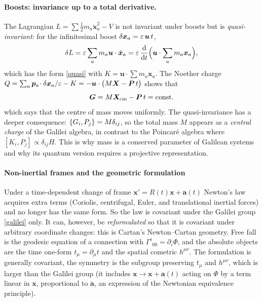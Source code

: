 \paragraph{Boosts: invariance up to a total derivative.}
The Lagrangian $L=\sum\tfrac12m_a\dot{\bm{x}}_a^2-V$ is not invariant under boosts
but is \emph{quasi-invariant}: for the infinitesimal boost
$\delta{\bm{x}}_a=\varepsilon\,\bm u\,t$,
\begin{equation}
  \delta L=\varepsilon\sum_a m_a\bm u\cdot\dot{\bm{x}}_a=\varepsilon\,\frac{\mathrm{d}}{\mathrm{d} t}\Big(\bm u\cdot\sum_a m_a{\bm{x}}_a\Big),
\end{equation}
which has the form \eqref{quasi} with $K=\bm u\cdot\sum m_a{\bm{x}}_a$. The
Noether charge $Q=\sum_a{\bm{p}}_a\!\cdot\delta{\bm{x}}_a/\varepsilon-K=-\bm u\cdot\big(M\bm X-\bm P\,t\big)$
shows that
\begin{equation}
  \bm G=M\bm X_{\rm cm}-\bm P\,t=\text{const.}
\end{equation}
which says that the centre of mass moves uniformly. The quasi-invariance has a
deeper consequence: $\{G_i,P_j\}=M\delta_{ij}$, so the total mass $M$
appears as a \emph{central charge} of the Galilei algebra, in contrast to
the Poincar\'e algebra where $[K_i,P_j]\propto\delta_{ij}H$. This is why mass
is a conserved parameter of Galilean systems and why its quantum version
requires a projective representation.

\paragraph{Non-inertial frames and the geometric formulation}
Under a time-dependent change of frame ${\bm{x}}'=R(t){\bm{x}}+\bm a(t)$ Newton's law
acquires extra terms (Coriolis, centrifugal, Euler, and translational
inertial forces) and no longer has the same form. So the law is covariant under the Galilei group
\eqref{galilei} only. It can, however, be \emph{reformulated} so that it is
covariant under arbitrary coordinate changes: this is Cartan's
Newton--Cartan geometry. Free fall is the geodesic equation
of a connection with $\Gamma^i{}_{00}=\partial_i\Phi$, and the absolute
objects are the time one-form $t_\mu=\partial_\mu t$ and the spatial
cometric $h^{\mu\nu}$. The formulation is generally covariant, the symmetry
is the subgroup preserving $t_\mu$ and $h^{\mu\nu}$, which is larger than the
Galilei group (it includes ${\bm{x}}\to{\bm{x}}+\bm a(t)$ acting on $\Phi$ by a term
linear in ${\bm{x}}$, proportional to $\ddot{\bm a}$, an expression of the
Newtonian equivalence principle). 

